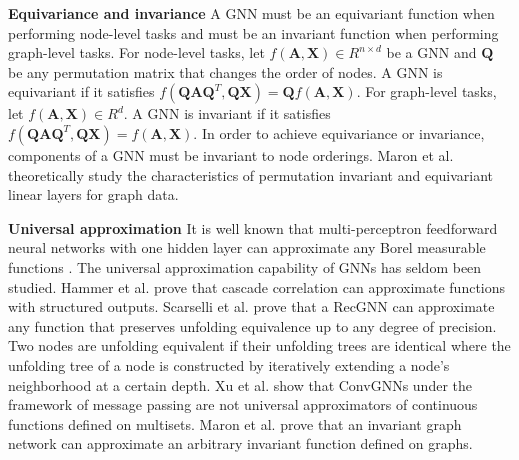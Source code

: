 	
	\vspace{2mm}
	\noindent\textbf{Equivariance and invariance}
	A GNN must be an equivariant function when performing node-level tasks and must be an invariant function when performing graph-level tasks. For node-level tasks, let $f(\mathbf{A},\mathbf{X}) \in R^{n\times d}$ be a GNN and $\mathbf{Q}$ be any permutation matrix that changes the order of nodes. A GNN is equivariant if it satisfies $f(\mathbf{Q}\mathbf{A}\mathbf{Q}^T,\mathbf{Q}\mathbf{X})=\mathbf{Q}f(\mathbf{A},\mathbf{X})$. For graph-level tasks, let $f(\mathbf{A},\mathbf{X}) \in R^{d}$. A GNN is invariant if it satisfies $f(\mathbf{Q}\mathbf{A}\mathbf{Q}^T,\mathbf{Q}\mathbf{X})=f(\mathbf{A},\mathbf{X})$. In order to achieve equivariance or invariance, components of a GNN must be invariant to node orderings. Maron et al. \cite{maron2019invariant} theoretically study the characteristics of permutation invariant and equivariant linear layers for graph data.
	
	\vspace{2mm}
	\noindent\textbf{Universal approximation} It is well known that multi-perceptron feedforward neural networks with one hidden layer can approximate any Borel measurable functions \cite{hornik1989multilayer}. The universal approximation capability of GNNs has seldom been studied. Hammer et al. \cite{hammer2005universal} prove that cascade correlation can approximate functions with structured outputs. Scarselli et al. \cite{scarselli2008computational} prove that a RecGNN \cite{scarselli2009graph} can approximate any function that preserves unfolding equivalence up to any degree of precision. 	Two nodes are unfolding equivalent if their unfolding trees are identical where the unfolding tree of a node is constructed by iteratively extending a node's neighborhood at a certain depth. Xu et al. \cite{xu2019how} show that ConvGNNs under the framework of message passing \cite{gilmer2017neural} are not universal approximators of continuous functions defined on multisets. Maron et al. \cite{maron2019invariant} prove that an invariant graph network can approximate an arbitrary invariant function defined on graphs.
	
